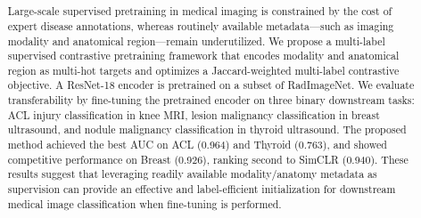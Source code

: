\usepackage{color}
\usepackage[dvipdfmx]{graphicx}
\usepackage{algorithm}
\usepackage{algorithmic}
\usepackage{bm}
\usepackage[utf8]{inputenc}
\usepackage{enumerate}
\usepackage{amsmath}
\usepackage{amssymb}
\usepackage{booktabs}
\usepackage{multirow}
\title{
}


\author{%
\and
{}
}



\begin{abstract}
Large-scale supervised pretraining in medical imaging is constrained by the cost of expert disease annotations, whereas routinely available metadata—such as imaging modality and anatomical region—remain underutilized. We propose a multi-label supervised contrastive pretraining framework that encodes modality and anatomical region as multi-hot targets and optimizes a Jaccard-weighted multi-label contrastive objective. A ResNet-18 encoder is pretrained on a subset of RadImageNet. We evaluate transferability by fine-tuning the pretrained encoder on three binary downstream tasks: ACL injury classification in knee MRI, lesion malignancy classification in breast ultrasound, and nodule malignancy classification in thyroid ultrasound. The proposed method achieved the best AUC on ACL (0.964) and Thyroid (0.763), and showed competitive performance on Breast (0.926), ranking second to SimCLR (0.940). These results suggest that leveraging readily available modality/anatomy metadata as supervision can provide an effective and label-efficient initialization for downstream medical image classification when fine-tuning is performed.


\end{abstract}

